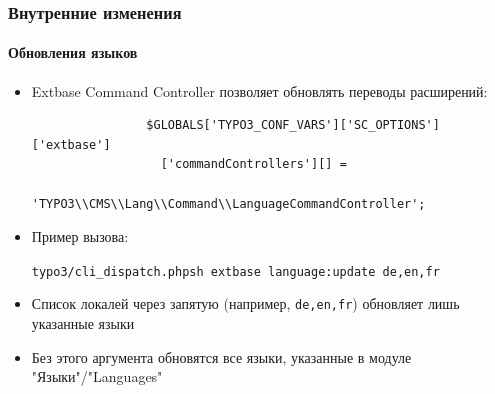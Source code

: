 
\begin{frame}[fragile]
	\frametitle{Внутренние изменения}
	\framesubtitle{Обновления языков}

	\begin{itemize}
		\item Extbase Command Controller позволяет обновлять переводы расширений:

			\begin{lstlisting}
				$GLOBALS['TYPO3_CONF_VARS']['SC_OPTIONS']['extbase']
				  ['commandControllers'][] =
				  'TYPO3\\CMS\\Lang\\Command\\LanguageCommandController';
			\end{lstlisting}

		\item Пример вызова:

			\lstinline!typo3/cli_dispatch.phpsh extbase language:update de,en,fr!

		\item Список локалей через запятую (например, \texttt{de,en,fr}) обновляет лишь указанные языки
		\item Без этого аргумента обновятся все языки, указанные в модуле "Языки"/"Languages"

	\end{itemize}

\end{frame}


